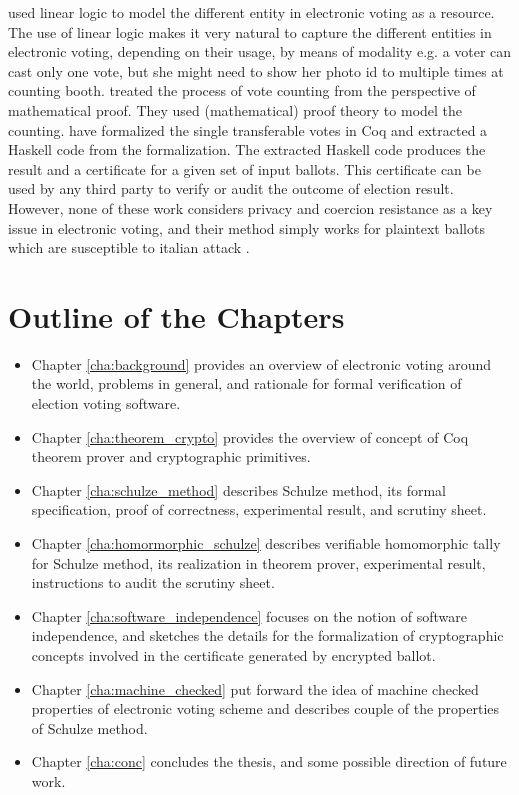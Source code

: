  \noindent
 \citep{DeYoung:2012:LLV} used linear logic \citep{GIRARD19871} to model the different entity in electronic voting as a resource. 
 The use of linear logic makes it very natural to capture the different entities in electronic voting,  
 depending on their usage, by means of modality e.g. a voter can cast only one vote, but she might 
 need to show her photo id to multiple times at counting booth. \citep{Pattinson:2015:VCM} treated 
 the process of vote counting from
 the perspective of mathematical proof. They used (mathematical) proof theory to model the 
 counting. \citep{Ghale:2017:FVS} have formalized the single transferable votes in Coq and 
 extracted a Haskell code from the formalization. The extracted Haskell code produces the result 
 and a certificate for a given set of input ballots. This certificate can be used by any third party to verify 
 or audit the outcome of election result.  However, none of these work considers privacy and coercion resistance as a key 
 issue in electronic voting, and their method simply works for plaintext ballots which are  susceptible to 
 italian attack  \citep{Otten}   \citep{Benaloh:2009:SSC}.

\section{Outline of the Chapters}
\begin{itemize}

\item Chapter \ref{cha:background} provides an overview of electronic voting around the world, 
problems in general, and rationale for formal verification of election voting software. 
\item Chapter \ref{cha:theorem_crypto} provides the overview of concept of 
Coq theorem prover  and cryptographic primitives.  
\item Chapter \ref{cha:schulze_method} 
describes Schulze method, its formal specification, proof of correctness, experimental result, 
and scrutiny sheet.  
\item Chapter \ref{cha:homormorphic_schulze} describes 
verifiable homomorphic tally for Schulze method, its realization in theorem prover, experimental 
result,  instructions to audit the scrutiny sheet. 
\item Chapter \ref{cha:software_independence} focuses on the notion of software independence, and 
sketches the details for the formalization of  cryptographic concepts involved in the 
certificate generated by encrypted ballot. 
\item Chapter \ref{cha:machine_checked} put forward the idea of 
machine checked properties of electronic voting scheme and describes couple of the 
properties of Schulze method. 
\item Chapter \ref{cha:conc} concludes the thesis, and some possible direction of future work. 
\end{itemize}


